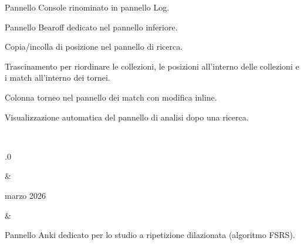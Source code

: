 \documentclass[letterpaper,10pt,italian]{sphinxmanual}
\begin{document}
\begin{savenotes}
\begin{longtable}{}
\begin{varwidth}[t]{}
\sphinxAtStartPar
Pannello Console rinominato in pannello Log.

\sphinxAtStartPar
Pannello Bearoff dedicato nel pannello inferiore.

\sphinxAtStartPar
Copia/incolla di posizione nel pannello di ricerca.

\sphinxAtStartPar
Trascinamento per riordinare le collezioni, le posizioni all’interno delle collezioni e i match all’interno dei tornei.

\sphinxAtStartPar
Colonna torneo nel pannello dei match con modifica inline.

\sphinxAtStartPar
Visualizzazione automatica del pannello di analisi dopo una ricerca.
\sphinxbeforeendvarwidth
\end{varwidth}%
\\
\sphinxhline\begin{varwidth}[t]{}
.0
\sphinxbeforeendvarwidth
\end{varwidth}%
&\begin{varwidth}[t]{}
 marzo 2026
\sphinxbeforeendvarwidth
\end{varwidth}%
&\begin{varwidth}[t]{}
\sphinxAtStartPar
Pannello Anki dedicato per lo studio a ripetizione dilazionata (algoritmo FSRS).


\end{varwidth}
\end{longtable}
\end{savenotes}
\end{document}
